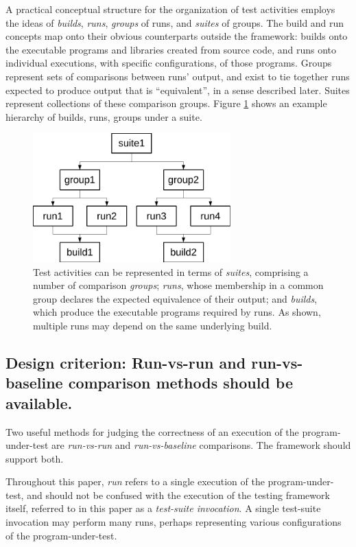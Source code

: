 \documentclass[conference]{IEEEtran}
\begin{document}
A practical conceptual structure for the organization of test activities employs the ideas of \emph{builds}, \emph{runs}, \emph{groups} of runs, and \emph{suites} of groups. The build and run concepts map onto their obvious counterparts outside the framework: builds onto the executable programs and libraries created from source code, and runs onto individual executions, with specific configurations, of those programs. Groups represent sets of comparisons between runs' output, and exist to tie together runs expected to produce output that is ``equivalent'', in a sense described later. Suites represent collections of these comparison groups. Figure \ref{figure:1} shows an example hierarchy of builds, runs, groups under a suite.

\begin{figure}[!t]
\centering
\includegraphics[width=3in]{fig5.pdf}
\caption{Test activities can be represented in terms of \emph{suites}, comprising a number of comparison \emph{groups}; \emph{runs}, whose membership in a common group declares the expected equivalence of their output; and \emph{builds}, which produce the executable programs required by runs. As shown, multiple runs may depend on the same underlying build.}
\label{figure:1}
\end{figure}

\subsection{Design criterion: Run-vs-run and run-vs-baseline comparison methods should be available.}

Two useful methods for judging the correctness of an execution of the program-under-test are \emph{run-vs-run} and \emph{run-vs-baseline} comparisons. The framework should support both.

Throughout this paper, \emph{run} refers to a single execution of the program-under-test, and should not be confused with the execution of the testing framework itself, referred to in this paper as a \emph{test-suite invocation}. A single test-suite invocation may perform many runs, perhaps representing various configurations of the program-under-test.
\end{document}
